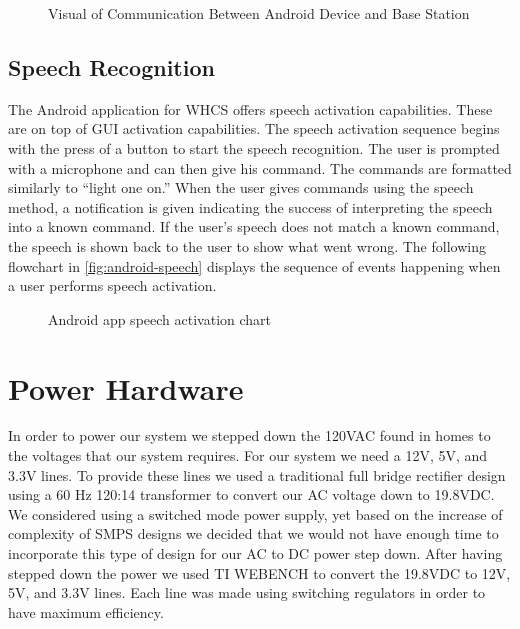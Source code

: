 \documentclass[draft,twocolumn,letterpaper,10pt]{IEEEtran}
\newcommand{\ucffig}[3]{
\begin{figure}[h]
\centering
\makebox[\linewidth][c]{
#2
}
\caption{#3}
\label{#1}
\end{figure}
}
\newcommand{\ucfgfx}[4][scale=1.0]{
\ucffig{#2}{\texttt{[image: \#3]}}{#4}
}
\begin{document}
\ucfgfx[width=\linewidth]{fig:android-comm}{a55-img005.png}{Visual of Communication Between
Android Device and Base Station}

\subsection{Speech Recognition}
The Android application for WHCS offers speech activation capabilities. These
are on top of GUI activation capabilities. The speech activation sequence
begins with the press of a button to start the speech recognition. The user is
prompted with a microphone and can then give his command. The commands are
formatted similarly to “light one on.” When the user gives commands using the
speech method, a notification is given indicating the success of interpreting
the speech into a known command. If the user’s speech does not match a known
command, the speech is shown back to the user to show what went wrong. The
following flowchart in \autoref{fig:android-speech} displays the sequence of events happening when
a user performs speech activation.

\ucfgfx[width=\linewidth]{fig:android-speech}{a55-img003.png}{Android app speech activation
chart}

\section{Power Hardware}
\label{sec:power-hw}
In order to power our system we stepped down the 120VAC found in homes to the
voltages that our system requires. For our system we need a 12V, 5V, and 3.3V
lines. To provide these lines we used a traditional full bridge rectifier
design using a 60 Hz 120:14 transformer to convert our AC voltage down to
19.8VDC. We considered using a switched mode power supply, yet based on the
increase of complexity of SMPS designs we decided that we would not have enough
time to incorporate this type of design for our AC to DC power step down. After
having stepped down the power we used TI WEBENCH to convert the 19.8VDC to 12V,
5V, and 3.3V lines. Each line was made using switching regulators in order to
have maximum efficiency.

\end{document}
